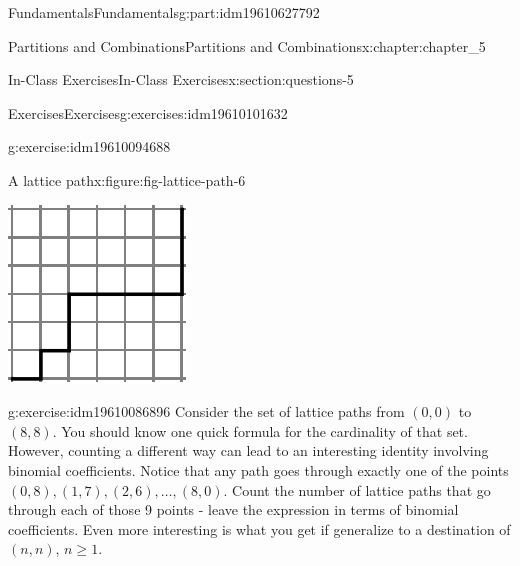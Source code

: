 \documentclass[oneside,10pt,]{book}
\numberwithin{equation}{section}
\begin{document}
\begin{partptx}{Fundamentals}{}{Fundamentals}{}{}{g:part:idm19610627792}
\begin{chapterptx}{Partitions and Combinations}{}{Partitions and Combinations}{}{}{x:chapter:chapter_5}
\begin{sectionptx}{In-Class Exercises}{}{In-Class Exercises}{}{}{x:section:questions-5}
\begin{exercises-subsection-numberless}{Exercises}{}{Exercises}{}{}{g:exercises:idm19610101632}
\begin{exercisegroup}
\begin{divisionexerciseeg}{6}{}{}{g:exercise:idm19610094688}
\begin{figureptx}{A lattice path}{x:figure:fig-lattice-path-6}{}
\begin{image}{0.25}{0.5}{0.25}
\includegraphics[width=\linewidth]{images/fig-lattice-path-6.png}
\end{image}%
\tcblower
\end{figureptx}%
\end{divisionexerciseeg}%
\begin{divisionexerciseeg}{7}{}{}{g:exercise:idm19610086896}%
Consider the set of lattice paths from \((0,0)\) to \((8,8)\).  You should know one quick formula for the cardinality of that set.  However, counting a different way can lead to an interesting  identity involving binomial coefficients.  Notice that any path goes through exactly one of the points \((0,8), (1,7), (2,6), \dots , (8,0)\).  Count the number of lattice paths that go through each of those 9 points - leave the expression in terms of binomial coefficients.  Even more interesting is what you get if  generalize to a destination of \((n,n)\), \(n \geq 1\).%
\end{divisionexerciseeg}%
\end{exercisegroup}
\par\medskip\noindent
\end{exercises-subsection-numberless}
\end{sectionptx}
%
%
\typeout{************************************************}
\typeout{************************************************}

\end{chapterptx}
\end{partptx}
\end{document}
